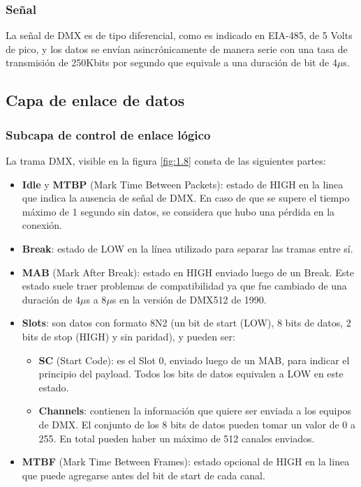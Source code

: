 \subsubsection{Señal}
La señal de DMX es de tipo diferencial, como es indicado en EIA-485, de 5 Volts de pico, y los datos se envían asincrónicamente de manera serie con una tasa de transmisión de 250Kbits por segundo que equivale a una duración de bit de 4\(\mu \)s.


\subsection{Capa de enlace de datos}
\subsubsection{Subcapa de control de enlace lógico}
La trama DMX, visible en la figura \ref{fig:1.8} consta de las siguientes partes:

\begin{itemize}
	\item \textbf{Idle} y \textbf{MTBP} (Mark Time Between Packets): estado de HIGH en la linea que indica la ausencia de señal de DMX. En caso de que se supere el tiempo máximo de 1 segundo sin datos, se considera que hubo una pérdida en la conexión.
	\item \textbf{Break}: estado de LOW en la línea utilizado para separar las tramas entre sí.
	\item \textbf{MAB} (Mark After Break): estado en HIGH enviado luego de un Break. Este estado suele traer problemas de compatibilidad ya que fue cambiado de una duración de 4\(\mu \)s a 8\(\mu \)s en la versión de DMX512 de 1990.
	\item \textbf{Slots}: son datos con formato 8N2 (un bit de start (LOW), 8 bits de datos, 2 bits de stop (HIGH) y sin paridad), y pueden ser:
	\begin{itemize}
		\item \textbf{SC} (Start Code): es el Slot 0, enviado luego de un MAB, para indicar el principio del payload. Todos los bits de datos equivalen a LOW en este estado.
		\item \textbf{Channels}: contienen la información que quiere ser enviada a los equipos de DMX. El conjunto de los 8 bits de datos pueden tomar un valor de 0 a 255. En total pueden haber un máximo de 512 canales enviados.
	\end{itemize}
	\item \textbf{MTBF} (Mark Time Between Frames): estado opcional de HIGH en la linea que puede agregarse antes del bit de start de cada canal.
\end{itemize}



